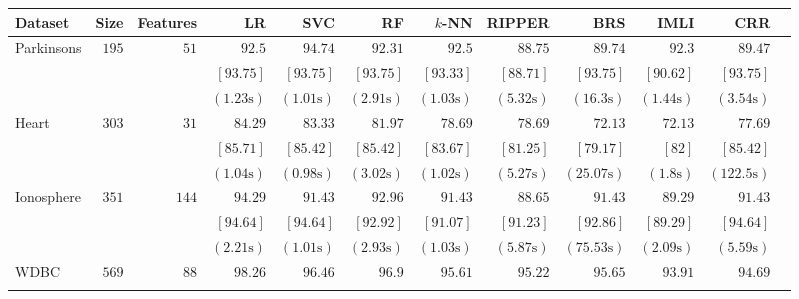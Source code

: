 \begin{table*}[h]		
	\setlength{\tabcolsep}{3pt}
	\begin{center}
		\begin{tabular}{l  r  r r r r r r r rrr}
			\toprule	
			{{Dataset}} & Size & Features  & LR & SVC & RF & $k$-NN & RIPPER & BRS & IMLI & CRR\\	
			\midrule
			{ Parkinsons}   & $  195 $  & $  51 $  & $   92.5  $    & $   94.74  $    & $   92.31  $    & $   92.5  $    & $   88.75  $    & $   89.74  $    & $   92.3  $    & $   89.47  $   \\ & & 
			& $  [ 93.75 ] $    & $  [ 93.75 ] $    & $  [ 93.75 ] $    & $  [ 93.33 ] $    & $  [ 88.71 ] $    & $  [ 93.75 ] $    & $  [ 90.62 ] $    & $  [ 93.75 ] $   \\ & & 
			& $  ( 1.23 \text{s} ) $    & $  ( 1.01 \text{s} ) $    & $  ( 2.91 \text{s} ) $    & $  ( 1.03 \text{s} ) $    & $  ( 5.32 \text{s} ) $    & $  ( 16.3 \text{s} ) $    & $  ( 1.44 \text{s} ) $    & $  ( 3.54 \text{s} ) $   \\[.1cm] 
			{ Heart}   & $  303 $  & $  31 $  & $   84.29  $    & $   83.33  $    & $   81.97  $    & $   78.69  $    & $   78.69  $    & $   72.13  $    & $   72.13  $    & $   77.69  $   \\ & & 
			& $  [ 85.71 ] $    & $  [ 85.42 ] $    & $  [ 85.42 ] $    & $  [ 83.67 ] $    & $  [ 81.25 ] $    & $  [ 79.17 ] $    & $  [ 82] $    & $  [ 85.42 ] $   \\ & & 
			& $  ( 1.04 \text{s} ) $    & $  ( 0.98 \text{s} ) $    & $  ( 3.02 \text{s} ) $    & $  ( 1.02 \text{s} ) $    & $  ( 5.27 \text{s} ) $    & $  ( 25.07 \text{s} ) $    & $  ( 1.8 \text{s} ) $    & $  ( 122.5 \text{s} ) $   \\[.1cm] 
			{ Ionosphere}   & $  351 $  & $  144 $  & $   94.29  $    & $   91.43  $    & $   92.96  $    & $   91.43  $    & $   88.65  $    & $   91.43  $    & $   89.29  $    & $   91.43  $   \\ & & 
			& $  [ 94.64 ] $    & $  [ 94.64 ] $    & $  [ 92.92 ] $    & $  [ 91.07 ] $    & $  [ 91.23 ] $    & $  [ 92.86 ] $    & $  [ 89.29 ] $    & $  [ 94.64 ] $   \\ & & 
			& $  ( 2.21 \text{s} ) $    & $  ( 1.01 \text{s} ) $    & $  ( 2.93 \text{s} ) $    & $  ( 1.03 \text{s} ) $    & $  ( 5.87 \text{s} ) $    & $  ( 75.53 \text{s} ) $    & $  ( 2.09 \text{s} ) $    & $  ( 5.59 \text{s} ) $   \\[.1cm] 
			{ WDBC}   & $  569 $  & $  88 $  & $   98.26  $    & $   96.46  $    & $   96.9  $    & $   95.61  $    & $   95.22  $    & $   95.65  $    & $   93.91  $    & $   94.69  $   \\ & & 

\end{tabular}
\end{center}
\end{table*}
